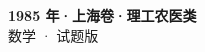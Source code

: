 \documentclass[zihao=-4, a4paper]{ctexart}
\begin{document}
\begin{center}
  {\Large\bfseries 1985 年·上海卷·理工农医类}\\[4pt]
  {\large 数学 · 试题版}
\end{center}
\medskip
{}

\end{document}
